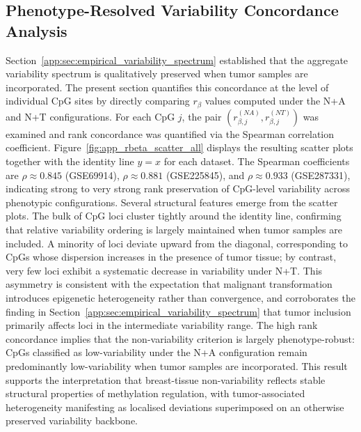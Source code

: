 \subsection{Phenotype-Resolved Variability Concordance Analysis}
\label{app:sec:phenotype_concordance}
Section~\ref{app:sec:empirical_variability_spectrum} established that 
the aggregate variability spectrum is qualitatively preserved when 
tumor samples are incorporated. The present section quantifies this 
concordance at the level of individual CpG sites by directly comparing 
$r_{\beta}$ values computed under the N+A and N+T configurations.
For each CpG $j$, the pair 
$\left(r_{\beta,j}^{(NA)}, r_{\beta,j}^{(NT)}\right)$ 
was examined and rank concordance was quantified via the Spearman 
correlation coefficient. Figure~\ref{fig:app_rbeta_scatter_all} 
displays the resulting scatter plots together with the identity line 
$y = x$ for each dataset. The Spearman coefficients are 
$\rho \approx 0.845$ (GSE69914), 
$\rho \approx 0.881$ (GSE225845), and 
$\rho \approx 0.933$ (GSE287331), 
indicating strong to very strong rank preservation of CpG-level 
variability across phenotypic configurations.
Several structural features emerge from the scatter plots. The bulk of 
CpG loci cluster tightly around the identity line, confirming that 
relative variability ordering is largely maintained when tumor samples 
are included. A minority of loci deviate upward from the diagonal, 
corresponding to CpGs whose dispersion increases in the presence of 
tumor tissue; by contrast, very few loci exhibit a systematic decrease 
in variability under N+T. This asymmetry is consistent with the 
expectation that malignant transformation introduces epigenetic 
heterogeneity rather than convergence, and corroborates the finding in 
Section~\ref{app:sec:empirical_variability_spectrum} that tumor 
inclusion primarily affects loci in the intermediate variability range.
The high rank concordance implies that the non-variability criterion is 
largely phenotype-robust: CpGs classified as low-variability under the 
N+A configuration remain predominantly low-variability when tumor 
samples are incorporated. This result supports the interpretation that 
breast-tissue non-variability reflects stable structural properties of 
methylation regulation, with tumor-associated heterogeneity manifesting 
as localised deviations superimposed on an otherwise preserved 
variability backbone.


